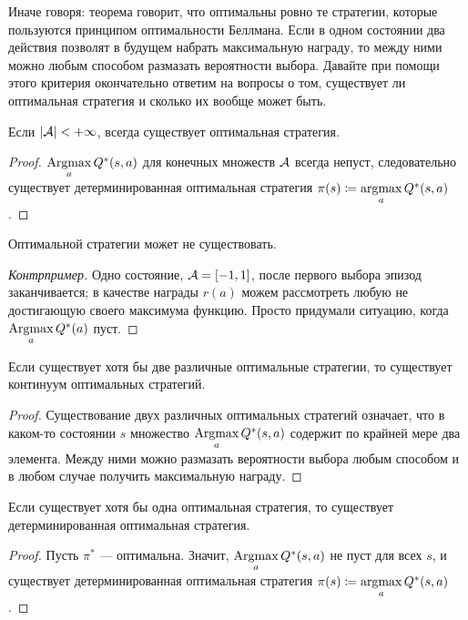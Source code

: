 Иначе говоря: теорема говорит, что оптимальны ровно те стратегии, которые пользуются принципом оптимальности Беллмана. Если в одном состоянии два действия позволят в будущем набрать максимальную награду, то между ними можно любым способом размазать вероятности выбора. Давайте при помощи этого критерия окончательно ответим на вопросы о том, существует ли оптимальная стратегия и сколько их вообще может быть.

\begin{proposition}
Если $|\mathcal{A}| < +\infty$, всегда существует оптимальная стратегия.
\begin{proof}
$\mathop{\mathrm{Argmax}}\limits_a Q^*(s, a)$ для конечных множеств $\mathcal{A}$ всегда непуст, следовательно существует детерминированная оптимальная стратегия $\pi(s) \coloneqq \mathop{\mathrm{argmax}}\limits_a Q^*(s, a)$.
\end{proof}
\end{proposition}

\begin{proposition}
Оптимальной стратегии может не существовать.
\begin{proof}[Контрпример]Одно состояние, $\mathcal{A} = [-1, 1]$, после первого выбора эпизод заканчивается; в качестве награды $r(a)$ можем рассмотреть любую не достигающую своего максимума функцию. Просто придумали ситуацию, когда $\mathop{\mathrm{Argmax}}\limits_{a} Q^*(a)$ пуст.
\end{proof}
\end{proposition}

\begin{proposition}
Если существует хотя бы две различные оптимальные стратегии, то существует континуум оптимальных стратегий.
\begin{proof}
Существование двух различных оптимальных стратегий означает, что в каком-то состоянии $s$ множество $\mathop{\mathrm{Argmax}}\limits_a Q^*(s, a)$ содержит по крайней мере два элемента. Между ними можно размазать вероятности выбора любым способом и в любом случае получить максимальную награду.
\end{proof}
\end{proposition}

\begin{proposition}\label{pr:deterministicoptimal}
Если существует хотя бы одна оптимальная стратегия, то существует детерминированная оптимальная стратегия.
\begin{proof}
Пусть $\pi^*$ --- оптимальна. Значит, $\mathop{\mathrm{Argmax}}\limits_a Q^*(s, a)$ не пуст для всех $s$, и существует детерминированная оптимальная стратегия $\pi(s) \coloneqq \mathop{\mathrm{argmax}}\limits_a Q^*(s, a)$.
\end{proof}
\end{proposition}

